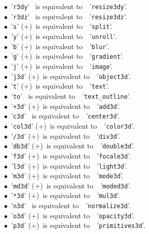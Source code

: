 \documentclass[a4paper,10.5pt,twoside]{book}
\newcommand{\Ca}[1]{\textcolor{ca}{#1}}
\begin{document}
$\bullet$~'\texttt{\Ca{r3dy}}' ~is equivalent to~~'\texttt{\Ca{resize3dy}}'.\\
$\bullet$~'\texttt{\Ca{r3dz}}' ~is equivalent to~~'\texttt{\Ca{resize3dz}}'.\\
$\bullet$~'\texttt{\Ca{s}}' (+)~is equivalent to~~'\texttt{\Ca{split}}'.\\
$\bullet$~'\texttt{\Ca{y}}' (+)~is equivalent to~~'\texttt{\Ca{unroll}}'.\\
$\bullet$~'\texttt{\Ca{b}}' (+)~is equivalent to~~'\texttt{\Ca{blur}}'.\\
$\bullet$~'\texttt{\Ca{g}}' (+)~is equivalent to~~'\texttt{\Ca{gradient}}'.\\
$\bullet$~'\texttt{\Ca{j}}' (+)~is equivalent to~~'\texttt{\Ca{image}}'.\\
$\bullet$~'\texttt{\Ca{j3d}}' (+)~is equivalent to~~'\texttt{\Ca{object3d}}'.\\
$\bullet$~'\texttt{\Ca{t}}' (+)~is equivalent to~~'\texttt{\Ca{text}}'.\\
$\bullet$~'\texttt{\Ca{to}}' ~is equivalent to~~'\texttt{\Ca{text\_outline}}'.\\
$\bullet$~'\texttt{\Ca{+3d}}' (+)~is equivalent to~~'\texttt{\Ca{add3d}}'.\\
$\bullet$~'\texttt{\Ca{c3d}}' ~is equivalent to~~'\texttt{\Ca{center3d}}'.\\
$\bullet$~'\texttt{\Ca{col3d}}' (+)~is equivalent to~~'\texttt{\Ca{color3d}}'.\\
$\bullet$~'\texttt{\Ca{/3d}}' (+)~is equivalent to~~'\texttt{\Ca{div3d}}'.\\
$\bullet$~'\texttt{\Ca{db3d}}' (+)~is equivalent to~~'\texttt{\Ca{double3d}}'.\\
$\bullet$~'\texttt{\Ca{f3d}}' (+)~is equivalent to~~'\texttt{\Ca{focale3d}}'.\\
$\bullet$~'\texttt{\Ca{l3d}}' (+)~is equivalent to~~'\texttt{\Ca{light3d}}'.\\
$\bullet$~'\texttt{\Ca{m3d}}' (+)~is equivalent to~~'\texttt{\Ca{mode3d}}'.\\
$\bullet$~'\texttt{\Ca{md3d}}' (+)~is equivalent to~~'\texttt{\Ca{moded3d}}'.\\
$\bullet$~'\texttt{\Ca{*3d}}' (+)~is equivalent to~~'\texttt{\Ca{mul3d}}'.\\
$\bullet$~'\texttt{\Ca{n3d}}' ~is equivalent to~~'\texttt{\Ca{normalize3d}}'.\\
$\bullet$~'\texttt{\Ca{o3d}}' (+)~is equivalent to~~'\texttt{\Ca{opacity3d}}'.\\
$\bullet$~'\texttt{\Ca{p3d}}' (+)~is equivalent to~~'\texttt{\Ca{primitives3d}}'.\\
\end{document}
